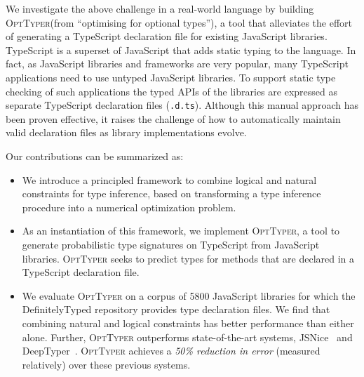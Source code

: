 \documentclass[sigplan,10pt,review,anonymous]{acmart} %
\newcommand{\projectname}{\textsc{OptTyper}\xspace}
\theoremstyle{plain}
\theoremstyle{remark}
\theoremstyle{definition}
\begin{document}
We investigate the above challenge in a real-world language by building
\projectname (from ``optimising for optional types''),
a tool that alleviates the effort of generating a
TypeScript declaration file for existing JavaScript libraries.
TypeScript is a superset of JavaScript that adds static typing to the language.
In fact, as JavaScript libraries and frameworks are very popular, many
TypeScript applications need to use untyped JavaScript libraries.
To support static type
checking of such applications the typed
APIs of the libraries are expressed as separate TypeScript
declaration files (\lstinline{.d.ts}).  Although this manual approach has been proven
effective, it raises the challenge of how to automatically maintain valid declaration files
as library implementations evolve.

Our contributions can be summarized as:
\begin{itemize}[label=\raisebox{0.25ex}{\tiny$\bullet$}]
	\item We introduce a principled framework to combine logical and natural constraints for type inference,
	      based on transforming a type inference procedure into a numerical optimization problem.
	\item As an instantiation of this framework, we implement \projectname, a tool to generate probabilistic type
	      signatures on TypeScript from JavaScript libraries.
	      \projectname seeks to predict types for methods that are declared in a TypeScript declaration file.
	\item We evaluate \projectname on a corpus of 5800 JavaScript libraries for which
	      the DefinitelyTyped repository provides type declaration files.
	      We find that combining natural and logical constraints
	      has better performance than either alone.
	      Further, \projectname outperforms state-of-the-art systems,
	      JSNice~\cite{raychev15} and DeepTyper~\cite{hellendoorn18}.
	      \projectname achieves a \emph{50\% reduction in error} (measured relatively) over these previous systems.
\end{itemize}
%
\end{document}
